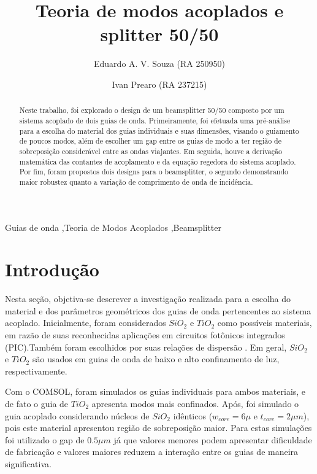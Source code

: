 \documentclass[final,12pt,times,twocolumn]{elsarticle}
\begin{document}
\begin{frontmatter}

\title{Teoria de modos acoplados e splitter 50/50}

\author[1]{Eduardo A. V. Souza (RA 250950)}
\author[1]{Ivan Prearo (RA 237215)}


\begin{abstract}
    Neste trabalho, foi explorado o design de um beamsplitter 50/50 composto por um sistema acoplado de dois guias de onda. Primeiramente, foi efetuada uma pré-análise para a escolha do material dos guias individuais e suas dimensões, visando o guiamento de poucos modos, além de escolher um gap entre os guias de modo a ter região de sobreposição considerável entre as ondas viajantes. Em seguida, houve a derivação matemática das contantes de acoplamento e da equação regedora do sistema acoplado. Por fim, foram propostos dois designs para o beamsplitter, o segundo demonstrando maior robustez quanto a variação de comprimento de onda de incidência.
\end{abstract}

\begin{keyword}
    Guias de onda \sep Teoria de Modos Acoplados \sep Beamsplitter
\end{keyword}

\end{frontmatter}

\section{Introdução}
\label{sec:intro}

Nesta seção, objetiva-se descrever a investigação realizada para a escolha do material e dos parâmetros geométricos dos guias de onda pertencentes ao sistema acoplado. Inicialmente, foram considerados $SiO_2$ e $TiO_2$ como possíveis materiais, em razão de suas reconhecidas aplicações em circuitos fotônicos integrados (PIC).Também foram escolhidos por suas relações de dispersão \cite{dispersao}. Em geral, $SiO_2$ e $TiO_2$ são usados em guias de onda de baixo e alto confinamento de luz, respectivamente.

Com o COMSOL, foram simulados os guias individuais para ambos materiais, e de fato o guia de $TiO_2$ apresenta modos mais confinados. Após, foi simulado o guia acoplado considerando núcleos de $SiO_2$ idênticos ($w_{core} = 6\mu$ e $t_{core} = 2\mu m$), pois este material apresentou região de sobreposição maior. Para estas simulações foi utilizado o gap de $0.5\mu m$ já que valores menores podem apresentar dificuldade de fabricação e valores maiores reduzem a interação entre os guias de maneira significativa.
\end{document}
